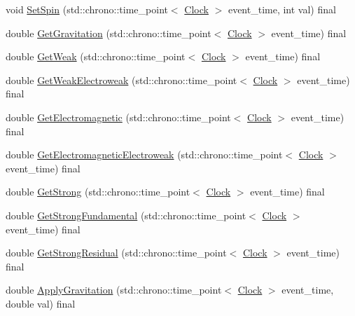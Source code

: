 \begin{DoxyCompactItemize}
\item 
void \hyperlink{class_monomer_ad24a86a4c1ac62d1b0ce8040d6b08adf}{Set\+Spin} (std\+::chrono\+::time\+\_\+point$<$ \hyperlink{universe_8h_a0ef8d951d1ca5ab3cfaf7ab4c7a6fd80}{Clock} $>$ event\+\_\+time, int val) final
\item 
double \hyperlink{class_monomer_aa5f7b901e15c9a9eb6e1c3564cd06e4f}{Get\+Gravitation} (std\+::chrono\+::time\+\_\+point$<$ \hyperlink{universe_8h_a0ef8d951d1ca5ab3cfaf7ab4c7a6fd80}{Clock} $>$ event\+\_\+time) final
\item 
double \hyperlink{class_monomer_ac2070d7e39cd0b2a00aa6023ffd51f55}{Get\+Weak} (std\+::chrono\+::time\+\_\+point$<$ \hyperlink{universe_8h_a0ef8d951d1ca5ab3cfaf7ab4c7a6fd80}{Clock} $>$ event\+\_\+time) final
\item 
double \hyperlink{class_monomer_aec6e42dde40c5b3142fab880eabb346a}{Get\+Weak\+Electroweak} (std\+::chrono\+::time\+\_\+point$<$ \hyperlink{universe_8h_a0ef8d951d1ca5ab3cfaf7ab4c7a6fd80}{Clock} $>$ event\+\_\+time) final
\item 
double \hyperlink{class_monomer_ad23f4829d66cb20401cc72a9d72ac320}{Get\+Electromagnetic} (std\+::chrono\+::time\+\_\+point$<$ \hyperlink{universe_8h_a0ef8d951d1ca5ab3cfaf7ab4c7a6fd80}{Clock} $>$ event\+\_\+time) final
\item 
double \hyperlink{class_monomer_a9b270cd1293bc9635813ead284bd3881}{Get\+Electromagnetic\+Electroweak} (std\+::chrono\+::time\+\_\+point$<$ \hyperlink{universe_8h_a0ef8d951d1ca5ab3cfaf7ab4c7a6fd80}{Clock} $>$ event\+\_\+time) final
\item 
double \hyperlink{class_monomer_aa35033340e88c46757d1d5ccba21a21e}{Get\+Strong} (std\+::chrono\+::time\+\_\+point$<$ \hyperlink{universe_8h_a0ef8d951d1ca5ab3cfaf7ab4c7a6fd80}{Clock} $>$ event\+\_\+time) final
\item 
double \hyperlink{class_monomer_a4bc8b39086260e26a196b28b4fc6667f}{Get\+Strong\+Fundamental} (std\+::chrono\+::time\+\_\+point$<$ \hyperlink{universe_8h_a0ef8d951d1ca5ab3cfaf7ab4c7a6fd80}{Clock} $>$ event\+\_\+time) final
\item 
double \hyperlink{class_monomer_a3b00168520f592098356f7cd3e663ad3}{Get\+Strong\+Residual} (std\+::chrono\+::time\+\_\+point$<$ \hyperlink{universe_8h_a0ef8d951d1ca5ab3cfaf7ab4c7a6fd80}{Clock} $>$ event\+\_\+time) final
\item 
double \hyperlink{class_monomer_a8747945cc2f7abd7ce0885345ad14ebc}{Apply\+Gravitation} (std\+::chrono\+::time\+\_\+point$<$ \hyperlink{universe_8h_a0ef8d951d1ca5ab3cfaf7ab4c7a6fd80}{Clock} $>$ event\+\_\+time, double val) final

\end{DoxyCompactItemize}
